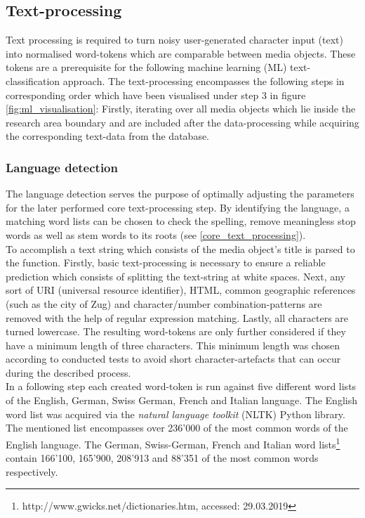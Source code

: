 \subsection{Text-processing} \label{text_processing}
Text processing is required to turn noisy user-generated character input (text) into normalised word-tokens which are comparable between media objects. These tokens are a prerequisite for the following machine learning (ML) text-classification approach. The text-processing encompasses the following steps in corresponding order which have been visualised under step 3 in figure \ref{fig:ml_visualisation}: Firstly, iterating over all media objects which lie inside the research area boundary and are included after the data-processing while acquiring the corresponding text-data from the database.

\subsubsection{Language detection} \label{language_detection}
The language detection serves the purpose of optimally adjusting the parameters for the later performed core text-processing step. By identifying the language, a matching word lists can be chosen to check the spelling, remove meaningless stop words as well as stem words to its roots (see \ref{core_text_processing}).\\
To accomplish a text string which consists of the media object's title is parsed to the function. Firstly, basic text-processing is necessary to ensure a reliable prediction which consists of splitting the text-string at white spaces. Next, any sort of URI (universal resource identifier), HTML, common geographic references (such as the city of Zug) and character/number combination-patterns are removed with the help of regular expression matching. Lastly, all characters are turned lowercase. The resulting word-tokens are only further considered if they have a minimum length of three characters. This minimum length was chosen according to conducted tests to avoid short character-artefacts that can occur during the described process.\\
In a following step each created word-token is run against five different word lists of the English, German, Swiss German, French and Italian language.
The English word list was acquired via the \textit{natural language toolkit} (NLTK) Python library. The mentioned list encompasses over 236'000 of the most common words of the English language.
The German, Swiss-German, French and Italian word lists\footnote{http://www.gwicks.net/dictionaries.htm, accessed: 29.03.2019} contain 166'100, 165'900, 208'913 and 88'351 of the most common words respectively.\\
